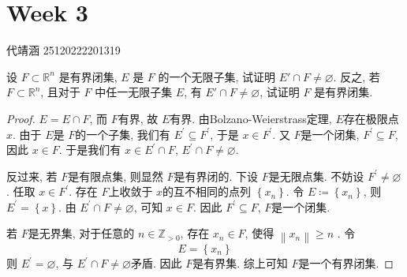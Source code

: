 \documentclass[../main.tex]{subfiles}
\begin{document}
\chapter{ Week 3 }

代靖涵 25120222201319

\begin{exercise}{}{}
    设 $F \subset \mathbb{R}^n$ 是有界闭集, $E$ 是 $F$ 的一个无限子集, 试证明 $E' \cap F \neq \varnothing$. 反之, 若 $F \subset \mathbb{R}^n$, 且对于 $F$ 中任一无限子集 $E$, 有 $E' \cap F \neq \varnothing$, 试证明 $F$ 是有界闭集.
\end{exercise}

\begin{proof}
    \(  E= E\cap F  \), 而 \(  F  \)有界, 故 \(  E  \)有界.   由Bolzano-Weierstrass定理, \(  E  \)存在极限点 \(  x  \).  由于 \(  E  \)是 \(  F  \)的一个子集, 我们有 \(  E^{\prime} \subseteq F^{\prime}   \), 于是 \(  x \in F^{\prime}   \). 又 \(  F  \)是一个闭集, \(  F^{\prime} \subseteq  F  \), 因此 \(  x \in F  \). 于是我们有 \(  x \in E^{\prime} \cap F  \), \(  E^{\prime} \cap F\neq \varnothing  \).
    
    反过来, 若 \(  F  \)是有限点集, 则显然 \(  F  \)是有界闭的. 下设 \(  F  \)是无限点集. 不妨设 \(  F^{\prime} \neq \varnothing  \).     任取 \(  x \in F^{\prime}   \). 存在 \(  F  \)上收敛于 \(  x  \)的互不相同的点列 \(  \left\{ x_{n} \right\}  \). 令 \(  E\coloneqq \left\{ x_{n} \right\}  \), 则 \(  E^{\prime} = \left\{ x \right\}  \). 由 \(  E^{\prime} \cap F\neq \varnothing  \), 可知 \(  x\in F  \).       因此 \(  F^{\prime} \subseteq F  \), \(  F  \)是一个闭集.  


   若 \(  F  \)是无界集, 对于任意的 \(  n \in \mathbb{Z} _{> 0}  \), 存在 \(  x_{n} \in F  \), 使得 \(  \left\| x_{n} \right\|\ge n  \)     . 令 \[
   E= \left\{ x_{n} \right\}
   \]则 \(  E^{\prime} = \varnothing  \), 与 \(  E^{\prime} \cap F\neq \varnothing  \)矛盾. 因此 \(  F  \)是有界集. 综上可知 \(  F  \)是一个有界闭集.    
\end{proof}
\end{document}

